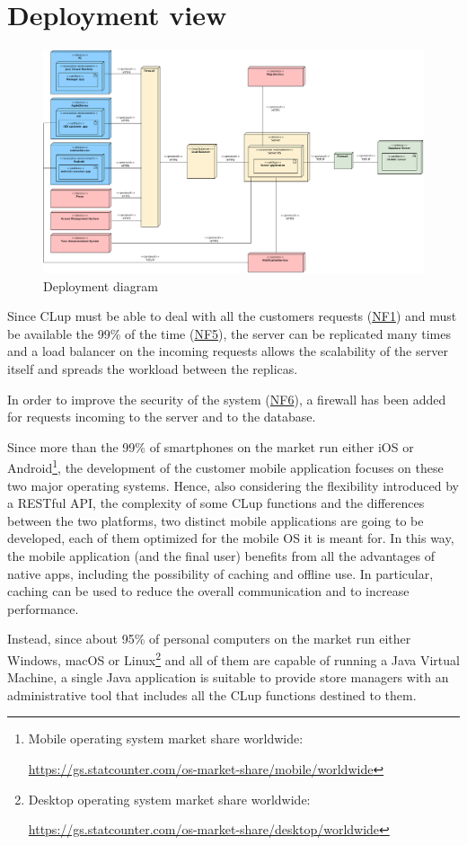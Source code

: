\documentclass[a4paper,oneside,11pt]{book}
\begin{document}
    \section{Deployment view}
    \begin{figure}[H]
        \centering
        \includegraphics[width=\textwidth, height=\textheight, keepaspectratio]{pictures/deployment_diagram}
        \caption{Deployment diagram}
        \label{figure:deployment_diagram}
    \end{figure}
    Since CLup must be able to deal with all the customers requests (\hyperlink{NF1}{NF1}) and must be available the 99\% of the time (\hyperlink{NF5}{NF5}), the server can be replicated many times and a load balancer on the incoming requests allows the scalability of the server itself and spreads the workload between the replicas. \par
    In order to improve the security of the system (\hyperlink{NF6}{NF6}), a firewall has been added for requests incoming to the server and to the database. \par
    Since more than the 99\% of smartphones on the market run either iOS or Android\footnote{Mobile operating system market share worldwide: \par \url{https://gs.statcounter.com/os-market-share/mobile/worldwide}}, the development of the customer mobile application focuses on these two major operating systems. Hence, also considering the flexibility introduced by a RESTful API, the complexity of some CLup functions and the differences between the two platforms, two distinct mobile applications are going to be developed, each of them optimized for the mobile OS it is meant for. In this way, the mobile application (and the final user) benefits from all the advantages of native apps, including the possibility of caching and offline use. In particular, caching can be used to reduce the overall communication and to increase performance. \par
    Instead, since about 95\% of personal computers on the market run either Windows, macOS or Linux\footnote{Desktop operating system market share worldwide: \par  \url{https://gs.statcounter.com/os-market-share/desktop/worldwide}} and all of them are capable of running a Java Virtual Machine, a single Java application is suitable to provide store managers with an administrative tool that includes all the CLup functions destined to them.
\end{document}
